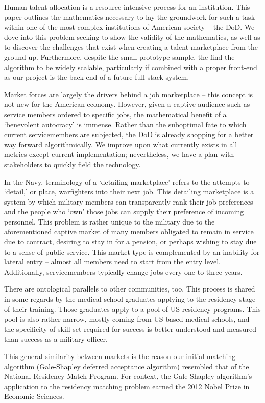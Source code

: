 Human talent allocation is a resource-intensive process for an institution. This paper outlines the mathematics necessary to lay the groundwork for such a task within one of the most complex institutions of American society -- the DoD.  We dove into this problem seeking to show the validity of the mathematics, as well as to discover the challenges that exist when creating a talent marketplace from the ground up. Furthermore, despite the small prototype sample, the find the algorithm to be widely scalable, particularly if combined with a proper front-end as our project is the back-end of a future full-stack system. 

Market forces are largely the drivers behind a job marketplace -- this concept is not new for the American economy.  However, given a captive audience such as service members ordered to specific jobs, the mathematical benefit of a ‘benevolent autocracy’ is immense.  Rather than the suboptimal fate to which current servicemembers are subjected, the DoD is already shopping for a better way forward algorithmically.  We improve upon what currently exists in all metrics except current implementation; nevertheless, we have a plan with stakeholders to quickly field the technology. 

In the Navy, terminology of a ‘detailing marketplace’ refers to the attempts to ‘detail,’ or place, warfighters into their next job.  This detailing marketplace is a system by which military members can transparently rank their job preferences and the people who ‘own’ those jobs can supply their preference of incoming personnel. This problem is rather unique to the military due to the aforementioned captive market of many members obligated to remain in service due to contract, desiring to stay in for a pension, or perhaps wishing to stay due to a sense of public service. This market type is complemented by an inability for lateral entry -- almost all members need to start from the entry level.  Additionally, servicemembers typically change jobs every one to three years. 

There are ontological parallels to other communities, too. This process is shared in some regards by the medical school graduates applying to the residency stage of their training. Those graduates apply to a pool of US residency programs. This pool is also rather narrow, mostly coming from US based medical schools, and the specificity of skill set required for success is better understood and measured than success as a military officer. 

This general similarity between markets is the reason our initial matching algorithm (Gale-Shapley deferred acceptance algorithm) resembled that of the National Residency Match Program. For context, the Gale-Shapley algorithm's application to the residency matching problem earned the 2012 Nobel Prize in Economic Sciences.

